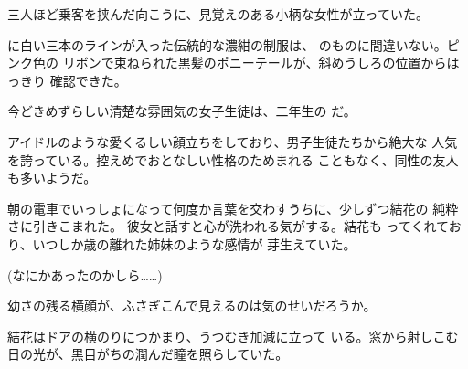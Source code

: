 ﻿\documentclass[
    book,tate,
    line_length=30zw,
    jafontsize=12pt,
    paper=b5j,
    landscape,
    ]{jlreq}
\begin{document}
三人ほど乗客を挟んだ向こうに、見覚えのある小柄な女性が立っていた。

に白い三本のラインが入った伝統的な濃紺の制服は、
のものに間違いない。ピンク色の
リボンで束ねられた黒髪のポニーテールが、斜めうしろの位置からはっきり
確認できた。

今どきめずらしい清楚な雰囲気の女子生徒は、二年生の
だ。

アイドルのような愛くるしい顔立ちをしており、男子生徒たちから絶大な
人気を誇っている。控えめでおとなしい性格のためまれる
こともなく、同性の友人も多いようだ。

朝の電車でいっしょになって何度か言葉を交わすうちに、少しずつ結花の
純粋さに引きこまれた。 彼女と話すと心が洗われる気がする。結花も
ってくれており、いつしか歳の離れた姉妹のような感情が
芽生えていた。

(なにかあったのかしら……)

幼さの残る横顔が、ふさぎこんで見えるのは気のせいだろうか。

結花はドアの横のりにつかまり、うつむき加減に立って
いる。窓から射しこむ日の光が、黒目がちの潤んだ瞳を照らしていた。


\section*{}

\end{document}
